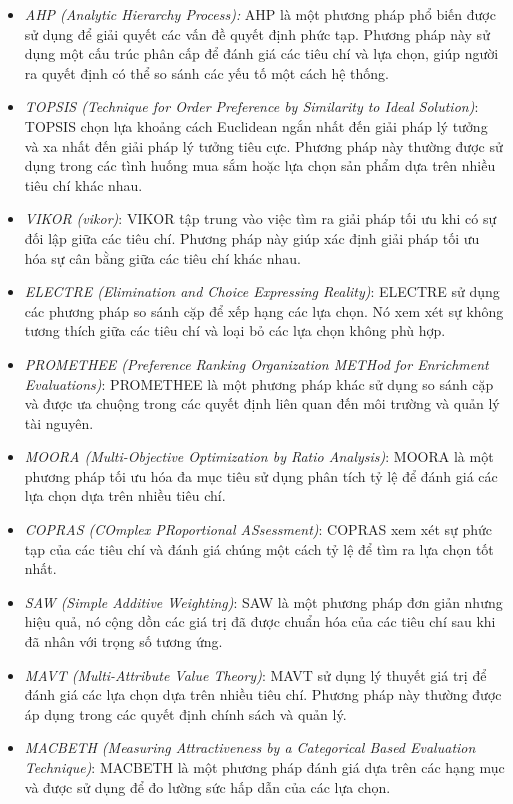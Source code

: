 \begin{itemize}
    \item \textit{AHP (Analytic Hierarchy Process):} AHP là một phương pháp phổ biến được sử dụng để giải quyết các vấn đề quyết định phức tạp. Phương pháp này sử dụng một cấu trúc phân cấp để đánh giá các tiêu chí và lựa chọn, giúp người ra quyết định có thể so sánh các yếu tố một cách hệ thống.
    \item \textit{TOPSIS (Technique for Order Preference by Similarity to Ideal Solution)}: TOPSIS chọn lựa khoảng cách Euclidean ngắn nhất đến giải pháp lý tưởng và xa nhất đến giải pháp lý tưởng tiêu cực. Phương pháp này thường được sử dụng trong các tình huống mua sắm hoặc lựa chọn sản phẩm dựa trên nhiều tiêu chí khác nhau.
    \item \textit{VIKOR (\acrlong{vikor})}: VIKOR tập trung vào việc tìm ra giải pháp tối ưu khi có sự đối lập giữa các tiêu chí. Phương pháp này giúp xác định giải pháp tối ưu hóa sự cân bằng giữa các tiêu chí khác nhau.
    \item \textit{ELECTRE (Elimination and Choice Expressing Reality)}: ELECTRE sử dụng các phương pháp so sánh cặp để xếp hạng các lựa chọn. Nó xem xét sự không tương thích giữa các tiêu chí và loại bỏ các lựa chọn không phù hợp.
    \item \textit{PROMETHEE (Preference Ranking Organization METHod for Enrichment Evaluations)}: PROMETHEE là một phương pháp khác sử dụng so sánh cặp và được ưa chuộng trong các quyết định liên quan đến môi trường và quản lý tài nguyên.
    \item \textit{MOORA (Multi-Objective Optimization by Ratio Analysis)}: MOORA là một phương pháp tối ưu hóa đa mục tiêu sử dụng phân tích tỷ lệ để đánh giá các lựa chọn dựa trên nhiều tiêu chí.
    \item \textit{COPRAS (COmplex PRoportional ASsessment)}: COPRAS xem xét sự phức tạp của các tiêu chí và đánh giá chúng một cách tỷ lệ để tìm ra lựa chọn tốt nhất.
    \item \textit{SAW (Simple Additive Weighting)}: SAW là một phương pháp đơn giản nhưng hiệu quả, nó cộng dồn các giá trị đã được chuẩn hóa của các tiêu chí sau khi đã nhân với trọng số tương ứng.
    \item \textit{MAVT (Multi-Attribute Value Theory)}: MAVT sử dụng lý thuyết giá trị để đánh giá các lựa chọn dựa trên nhiều tiêu chí. Phương pháp này thường được áp dụng trong các quyết định chính sách và quản lý.
    \item \textit{MACBETH (Measuring Attractiveness by a Categorical Based Evaluation Technique)}: MACBETH là một phương pháp đánh giá dựa trên các hạng mục và được sử dụng để đo lường sức hấp dẫn của các lựa chọn.
\end{itemize}

